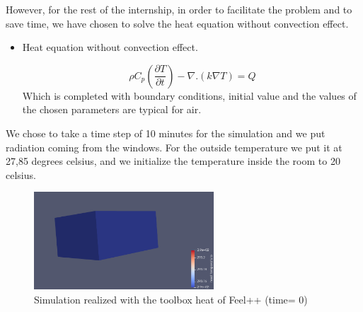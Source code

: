 \newline\noindent However, for the rest of the internship, in order to facilitate the problem and to save time, we have chosen to solve the heat equation without convection effect.
\begin{itemize}
    \item Heat equation without convection effect.

 $$\rho C_p(\frac{\partial T}{\partial t})-\nabla .(k \nabla T)=Q$$
\noindent Which is completed with boundary conditions, initial value and the values of the chosen parameters are typical for air.
\end{itemize}
\noindent We chose to take a time step of 10 minutes for the simulation and we put radiation coming from the windows. For the outside temperature we put it at 27,85 degrees celsius, and we initialize the temperature inside the room to 20 celsius.
\begin{figure}[H]
        \centering
		\includegraphics[width=0.6\textwidth]{"images/enkf/sim_1.png"}
		\caption{Simulation realized with the toolbox heat of Feel++ (time= 0)}
\end{figure}
